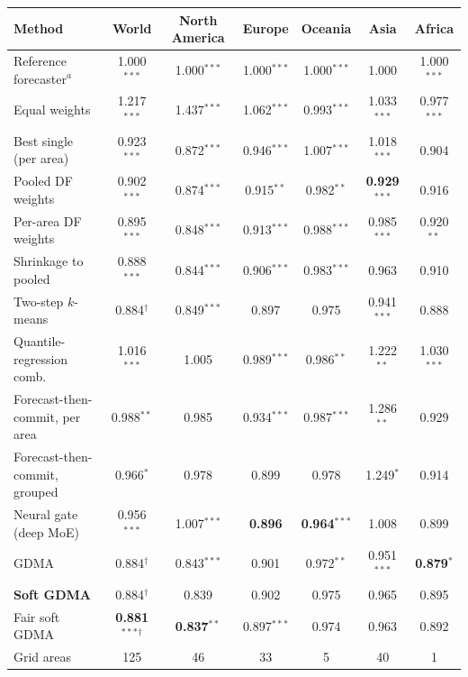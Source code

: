 \begin{tabular}{@{}lcccccc@{}}
\toprule
Method & World & North America & Europe & Oceania & Asia & Africa \\
\midrule
Reference forecaster$^a$ & 1.000$^{***}$ & 1.000$^{***}$ & 1.000$^{***}$ & 1.000$^{***}$ & 1.000 & 1.000$^{***}$ \\
Equal weights & 1.217$^{***}$ & 1.437$^{***}$ & 1.062$^{***}$ & 0.993$^{***}$ & 1.033$^{***}$ & 0.977$^{***}$ \\
Best single (per area) & 0.923$^{***}$ & 0.872$^{***}$ & 0.946$^{***}$ & 1.007$^{***}$ & 1.018$^{***}$ & 0.904 \\
Pooled DF weights & 0.902$^{***}$ & 0.874$^{***}$ & 0.915$^{**}$ & 0.982$^{**}$ & \textbf{0.929}$^{***}$ & 0.916 \\
Per-area DF weights & 0.895$^{***}$ & 0.848$^{***}$ & 0.913$^{***}$ & 0.988$^{***}$ & 0.985$^{***}$ & 0.920$^{**}$ \\
Shrinkage to pooled & 0.888$^{***}$ & 0.844$^{***}$ & 0.906$^{***}$ & 0.983$^{***}$ & 0.963 & 0.910 \\
Two-step $k$-means & 0.884$^\dagger$ & 0.849$^{***}$ & 0.897 & 0.975 & 0.941$^{***}$ & 0.888 \\
Quantile-regression comb. & 1.016$^{***}$ & 1.005 & 0.989$^{***}$ & 0.986$^{**}$ & 1.222$^{**}$ & 1.030$^{***}$ \\
Forecast-then-commit, per area & 0.988$^{**}$ & 0.985 & 0.934$^{***}$ & 0.987$^{***}$ & 1.286$^{**}$ & 0.929 \\
Forecast-then-commit, grouped & 0.966$^{*}$ & 0.978 & 0.899 & 0.978 & 1.249$^{*}$ & 0.914 \\
Neural gate (deep MoE) & 0.956$^{***}$ & 1.007$^{***}$ & \textbf{0.896} & \textbf{0.964}$^{***}$ & 1.008 & 0.899 \\
GDMA & 0.884$^\dagger$ & 0.843$^{***}$ & 0.901 & 0.972$^{**}$ & 0.951$^{***}$ & \textbf{0.879}$^{*}$ \\
\textbf{Soft GDMA} & 0.884$^\dagger$ & 0.839 & 0.902 & 0.975 & 0.965 & 0.895 \\
Fair soft GDMA & \textbf{0.881}$^{***}$$^\dagger$ & \textbf{0.837}$^{**}$ & 0.897$^{***}$ & 0.974 & 0.963 & 0.892 \\
\midrule
Grid areas & 125 & 46 & 33 & 5 & 40 & 1 \\
\bottomrule
\end{tabular}